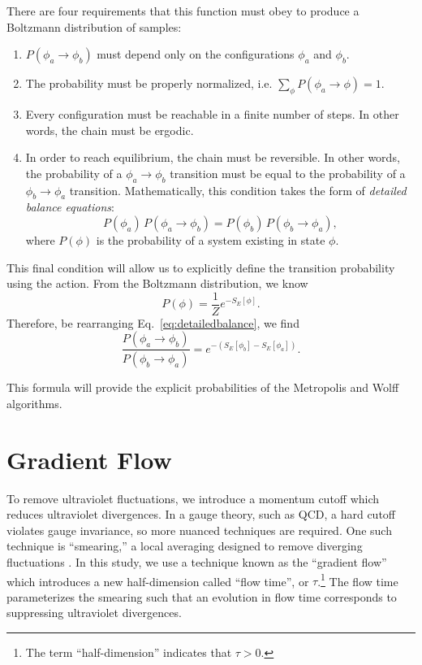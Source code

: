 \documentclass[12pt]{report}
\begin{document}
There are four requirements that this function must obey to produce a Boltzmann distribution of samples:
\begin{enumerate}
    \item $P(\phi_a \rightarrow \phi_b)$ must depend only on the configurations $\phi_a$ and $\phi_b$.
    \item The probability must be properly normalized, i.e. $\sum_{\phi} P(\phi_a \rightarrow \phi) = 1$.
    \item Every configuration must be reachable in a finite number of steps. In other words, the chain must be ergodic.
    \item In order to reach equilibrium, the chain must be reversible. In other words, the probability of a $\phi_a\rightarrow\phi_b$ transition must be equal to the probability of a $\phi_b\rightarrow\phi_a$ transition. Mathematically, this condition takes the form of \textit{detailed balance equations}:
\begin{equation}
    \label{eq:detailedbalance}
    P(\phi_a)\,P(\phi_a\rightarrow\phi_b) = P(\phi_b)\,P(\phi_b\rightarrow\phi_a),
\end{equation}
where $P(\phi)$ is the probability of a system existing in state $\phi$.
\end{enumerate}

This final condition will allow us to explicitly define the transition probability using the action. From the Boltzmann distribution, we know
\begin{equation}
    P(\phi) = \frac{1}{Z} e^{-S_E[\phi]}.
\end{equation}
Therefore, be rearranging Eq.~\ref{eq:detailedbalance}, we find
\begin{equation}
    \frac{P(\phi_a\rightarrow\phi_b)}{P(\phi_b\rightarrow\phi_a)} = e^{-(S_E[\phi_b] - S_E[\phi_a])}.
\end{equation}

This formula will provide the explicit probabilities of the Metropolis and Wolff algorithms.


\section{Gradient Flow}
\label{sec:gradflow}
To remove ultraviolet fluctuations, we introduce a momentum cutoff which reduces ultraviolet divergences. In a gauge theory, such as QCD, a hard cutoff violates gauge invariance, so more nuanced techniques are required. One such technique is ``smearing,'' a local averaging designed to remove diverging fluctuations \cite{solbrig2007}. In this study, we use a technique known as the ``gradient flow'' \cite{monahan2015} which introduces a new half-dimension called ``flow time'', or $\tau$.\footnote{The term ``half-dimension'' indicates that $\tau>0$.}  The flow time parameterizes the smearing such that an evolution in flow time corresponds to suppressing ultraviolet divergences. 
\end{document}
